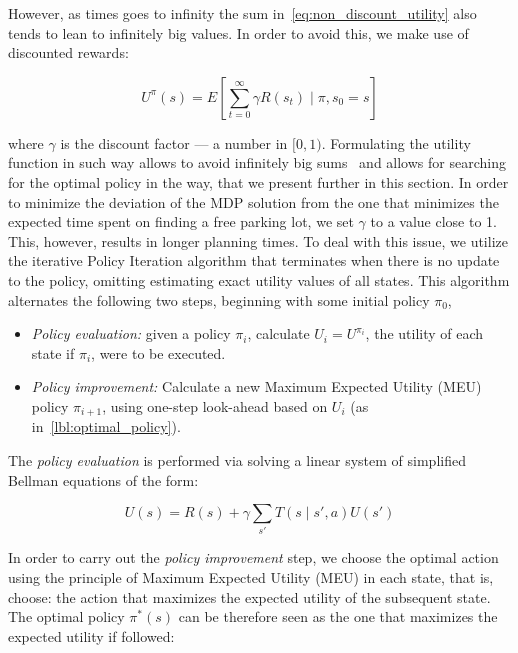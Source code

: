 However, as times goes to infinity the sum in~\eqref{eq:non_discount_utility}
also tends to lean to infinitely big values. In order to avoid this, we make
use of discounted rewards:

\begin{equation}
\label{eq:discount_utility}
U^{\pi}(s) = E\left[\sum_{t=0}^{\infty} \gamma R(s_t) \mid \pi,s_0 = s \right]
\end{equation}

where $\gamma$ is the discount factor --- a number in $[0, 1)$. Formulating
the utility function in such way allows to avoid infinitely big
sums~\cite{Russell:2003:AIM:773294} and allows for searching for the optimal
policy in the way, that we present further in this section. In order to
minimize the deviation of the MDP solution from the one that minimizes the
expected time spent on finding a free parking lot, we set $\gamma$ to a value
close to 1. This, however, results in longer planning times. To deal with this
issue, we utilize the iterative Policy Iteration algorithm that terminates
when there is no update to the policy, omitting estimating exact utility
values of all states. This algorithm alternates the following two steps,
beginning with some initial policy $\pi_0$,

\begin{itemize}
    \item \emph{Policy evaluation:} given a policy $\pi_i$,
    calculate $U_i = U^{\pi_i}$, the utility of each state if $\pi_i$, were to be
    executed.
    \item \emph{Policy improvement:} Calculate a new Maximum Expected Utility (MEU) policy $\pi_{i+1}$, using one-step look-ahead based on
    $U_i$ (as in~\eqref{lbl:optimal_policy}).
\end{itemize}

The \emph{policy evaluation} is performed via solving a linear system of simplified Bellman equations of the form:

\begin{equation}
\label{lbl:bellman_equation}
U(s) = R(s) + \gamma \sum_{s'}T(s \mid s', a)U(s')
\end{equation}

In order to carry out the \emph{policy improvement} step, we choose the
optimal action using the principle of Maximum Expected Utility (MEU) in each
state, that is, choose: the action that maximizes the expected utility of the
subsequent state. The optimal policy $\pi^*(s)$ can be therefore seen as the one that maximizes
the expected utility if followed:

